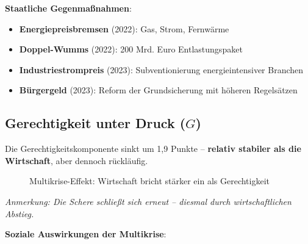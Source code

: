 \textbf{Staatliche Gegenmaßnahmen}:
\begin{itemize}
    \item \textbf{Energiepreisbremsen} (2022): Gas, Strom, Fernwärme
    \item \textbf{Doppel-Wumms} (2022): 200 Mrd. Euro Entlastungspaket
    \item \textbf{Industriestrompreis} (2023): Subventionierung energieintensiver Branchen
    \item \textbf{Bürgergeld} (2023): Reform der Grundsicherung mit höheren Regelsätzen
\end{itemize}

\subsection{Gerechtigkeit unter Druck (\(G\))}

Die Gerechtigkeitskomponente sinkt um 1,9 Punkte – \textbf{relativ stabiler als die Wirtschaft}, aber dennoch rückläufig.

\begin{figure}[ht]
    \centering
    \caption{Multikrise-Effekt: Wirtschaft bricht stärker ein als Gerechtigkeit}
    \label{fig:multikrise_effekt}
\end{figure}

\begin{flushleft}
\footnotesize{\textit{Anmerkung: Die Schere schließt sich erneut – diesmal durch wirtschaftlichen Abstieg.}}
\end{flushleft}

\textbf{Soziale Auswirkungen der Multikrise}:

